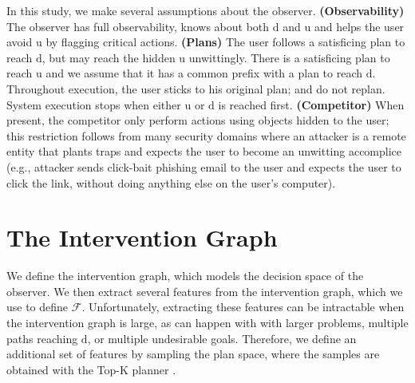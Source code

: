 \documentclass[letterpaper]{article}
\theoremstyle{plain}
\newtheorem{definition}{Definition}
\begin{document}


In this study, we make several assumptions about the observer.
\textbf{(Observability)} 
The observer has full observability, knows about both $\mathrm{d}$ and $\mathrm{u}$ and helps the user avoid $\mathrm{u}$ by flagging critical actions.
\textbf{(Plans)} 
The user follows a satisficing plan to reach $\mathrm{d}$, but may reach the hidden $\mathrm{u}$ unwittingly. 
There is a satisficing plan to reach $\mathrm{u}$ and we assume that it has a common prefix with a plan to reach $\mathrm{d}$. 
Throughout execution, the user sticks to his original plan; and do not replan. System execution stops when either $\mathrm{u}$ or $\mathrm{d}$ is reached first.
\textbf{(Competitor)}
When present, the competitor only perform actions using objects hidden to the user; this restriction follows from many security domains where an attacker is a remote entity that plants traps and expects the user to become an unwitting accomplice (e.g., attacker sends click-bait phishing email to the user and expects the user to click the link, without doing anything else on the user's computer).





\section{The Intervention Graph}
\label{sec:stategraph}
We define the intervention graph, which models the decision space of the observer.
We then extract several features from the  intervention graph, which we use to define $\mathcal{F}$.
Unfortunately, extracting these features can be intractable when the intervention graph is large, as can happen with with larger problems, multiple paths reaching $\mathrm{d}$, or multiple undesirable goals. Therefore, we define an additional set of features by sampling the plan space, where the samples are obtained with the Top-K planner \cite{riabov2014}.
\end{document}
